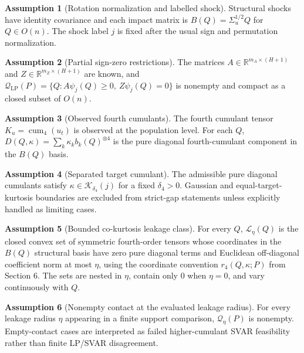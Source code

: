 \documentclass[11pt]{article}
\newcommand{\R}{\mathbb{R}}
\theoremstyle{definition}
\newtheorem{assumption}{Assumption}
\theoremstyle{plain}
\theoremstyle{remark}
\begin{document}
\begin{assumption}[Rotation normalization and labelled shock]\label{ass:normalization}
Structural shocks have identity covariance and each impact matrix is \(B(Q)=\Sigma_u^{1/2}Q\) for \(Q\in O(n)\).  The shock label \(j\) is fixed after the usual sign and permutation normalization.
\end{assumption}

\begin{assumption}[Partial sign-zero restrictions]\label{ass:sign-zero}
The matrices \(A\in\R^{m_A\times(H+1)}\) and \(Z\in\R^{m_Z\times(H+1)}\) are known, and \(\mathcal Q_{\mathrm{LP}}(P)=\{Q:A\psi_j(Q)\ge0,\ Z\psi_j(Q)=0\}\) is nonempty and compact as a closed subset of \(O(n)\).
\end{assumption}

\begin{assumption}[Observed fourth cumulants]\label{ass:cumulants}
The fourth cumulant tensor \(K_u=\operatorname{cum}_4(u_t)\) is observed at the population level.  For each \(Q\), \(D(Q,\kappa)=\sum_k\kappa_kb_k(Q)^{\otimes4}\) is the pure diagonal fourth-cumulant component in the \(B(Q)\) basis.
\end{assumption}

\begin{assumption}[Separated target cumulant]\label{ass:separated-target}
The admissible pure diagonal cumulants satisfy \(\kappa\in\mathcal K_{\delta_4}(j)\) for a fixed \(\delta_4>0\).  Gaussian and equal-target-kurtosis boundaries are excluded from strict-gap statements unless explicitly handled as limiting cases.
\end{assumption}

\begin{assumption}[Bounded co-kurtosis leakage class]\label{ass:leakage-class}
For every \(Q\), \(\mathcal L_\eta(Q)\) is the closed convex set of symmetric fourth-order tensors whose coordinates in the \(B(Q)\) structural basis have zero pure diagonal terms and Euclidean off-diagonal coefficient norm at most \(\eta\), using the coordinate convention \(r_4(Q,\kappa;P)\) from Section 6.  The sets are nested in \(\eta\), contain only \(0\) when \(\eta=0\), and vary continuously with \(Q\).
\end{assumption}

\begin{assumption}[Nonempty contact at the evaluated leakage radius]\label{ass:contact-nonempty}
For every leakage radius \(\eta\) appearing in a finite support comparison, \(\mathcal Q_\eta(P)\) is nonempty.  Empty-contact cases are interpreted as failed higher-cumulant SVAR feasibility rather than finite LP/SVAR disagreement.
\end{assumption}
\end{document}
